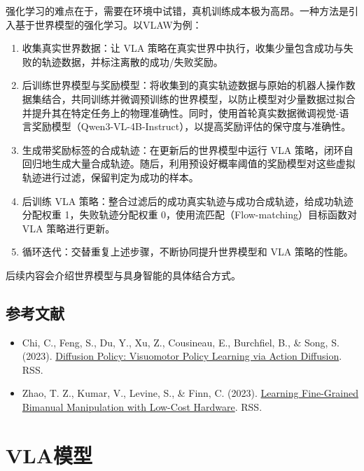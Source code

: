 强化学习的难点在于，需要在环境中试错，真机训练成本极为高昂。一种方法是引入基于世界模型的强化学习。以VLAW为例：

\begin{enumerate}
\def\labelenumi{\arabic{enumi}.}
\tightlist
\item
  收集真实世界数据：让 VLA 策略在真实世界中执行，收集少量包含成功与失败的轨迹数据，并标注离散的成功/失败奖励。
\item
  后训练世界模型与奖励模型：将收集到的真实轨迹数据与原始的机器人操作数据集结合，共同训练并微调预训练的世界模型，以防止模型对少量数据过拟合并提升其在特定任务上的物理准确性。同时，使用首轮真实数据微调视觉-语言奖励模型（Qwen3-VL-4B-Instruct），以提高奖励评估的保守度与准确性。
\item
  生成带奖励标签的合成轨迹：在更新后的世界模型中运行 VLA 策略，闭环自回归地生成大量合成轨迹。随后，利用预设好概率阈值的奖励模型对这些虚拟轨迹进行过滤，保留判定为成功的样本。
\item
  后训练 VLA 策略：整合过滤后的成功真实轨迹与成功合成轨迹，给成功轨迹分配权重 1，失败轨迹分配权重 0，使用流匹配（Flow-matching）目标函数对 VLA 策略进行更新。
\item
  循环迭代：交替重复上述步骤，不断协同提升世界模型和 VLA 策略的性能。
\end{enumerate}

后续内容会介绍世界模型与具身智能的具体结合方式。

\hypertarget{ux53c2ux8003ux6587ux732e-173}{%
\subsection{参考文献}\label{ux53c2ux8003ux6587ux732e-173}}

\begin{itemize}
\tightlist
\item
  Chi, C., Feng, S., Du, Y., Xu, Z., Cousineau, E., Burchfiel, B., \& Song, S. (2023). \href{https://arxiv.org/abs/2303.04137}{Diffusion Policy: Visuomotor Policy Learning via Action Diffusion}. RSS.
\item
  Zhao, T. Z., Kumar, V., Levine, S., \& Finn, C. (2023). \href{https://arxiv.org/abs/2304.13705}{Learning Fine-Grained Bimanual Manipulation with Low-Cost Hardware}. RSS.
\end{itemize}

\clearpage

\hypertarget{vlaux6a21ux578b}{%
\section{VLA模型}\label{vlaux6a21ux578b}}

